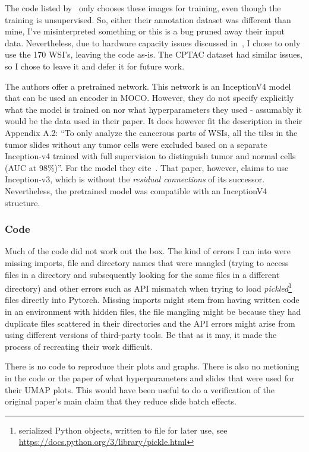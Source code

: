 \documentclass[10pt,twocolumn,letterpaper]{article}
\begin{document}
The code listed by~\cite{sslUMAP} only chooses these images for training, even though the training is unsupervised. So, either their annotation dataset was different than mine, I've misinterpreted something or this is a bug pruned away their input data. Nevertheless, due to hardware capacity issues discussed in~, I chose to only use the 170 \gls{WSI}'s, leaving the code as-is. The CPTAC dataset had similar issues, so I chose to leave it and defer it for future work.

The authors offer a pretrained network. This network is an InceptionV4 model that can be used an encoder in \gls{MOCO}. However, they do not specify explicitly what the model is trained on nor what hyperparameters they used - assumably it would be the data used in their paper. It does however fit the description in their Appendix A.2: ``To only analyze the cancerous parts of WSIs, all the tiles in the tumor slides without any tumor cells were excluded based on a separate Inception-v4 trained with full supervision to distinguish tumor and normal
cells (AUC at 98\%)''. For the model they cite~\cite{coudray2018classification}. That paper, however, claims to use Inception-v3, which is without the \textit{residual connections} of its successor. Nevertheless, the pretrained model was compatible with an InceptionV4 structure.

\subsubsection{Code}\label{subsubsec:code}
Much of the code did not work out the box. The kind of errors I ran into were missing imports, file and directory names that were mangled (trying to access files in a directory and subsequently looking for the same files in a different directory) and other errors such as API mismatch when trying to load \textit{pickled}\footnote{serialized Python objects, written to file for later use, see \href{https://docs.python.org/3/library/pickle.html}{https://docs.python.org/3/library/pickle.html}} files directly into Pytorch. Missing imports might stem from having written code in an environment with hidden files, the file mangling might be because they had duplicate files scattered in their directories and the API errors might arise from using different versions of third-party tools. Be that as it may, it made the process of recreating their work difficult.

There is no code to reproduce their plots and graphs. There is also no metioning in the code or the paper of what hyperparameters and slides that were used for their \gls{UMAP} plots. This would have been useful to do a verification of the original paper's main claim that they reduce slide batch effects.
\end{document}
